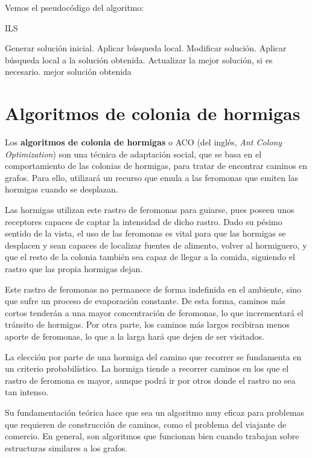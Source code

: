 Vemos el pseudocódigo del algoritmo:

\begin{algorithm}[H]
\caption{ILS}
  \begin{algorithmic}
    \State Generar solución inicial.
    \State Aplicar búsqueda local.
    \Repeat
      \State Modificar solución.
      \State Aplicar búsqueda local a la solución obtenida.
      \State Actualizar la mejor solución, si es necesario.
    \Return mejor solución obtenida
  \EndFunction
  \end{algorithmic}
\end{algorithm}

\section{Algoritmos de colonia de hormigas}\label{aco}

Los \textbf{algoritmos de colonia de hormigas} \citep{dorigo:1996} o ACO
(del inglés, \textit{Ant Colony Optimization}) son una técnica de adaptación social,
que se basa en el comportamiento de las colonias de hormigas, para tratar de encontrar
caminos en grafos. Para ello, utilizará un recurso que emula a las feromonas que
emiten las hormigas cuando se desplazan.

Las hormigas utilizan este rastro de feromonas para guiarse, pues poseen unos receptores
capaces de captar la intensidad de dicho rastro. Dado su pésimo sentido de la vista,
el uso de las feromonas es vital para que las hormigas se desplacen y sean capaces de
localizar fuentes de alimento, volver al hormiguero, y que el resto de la colonia también
sea capaz de llegar a la comida, siguiendo el rastro que las propia hormigas dejan.

Este rastro de feromonas no permanece de forma indefinida en el ambiente, sino que
sufre un proceso de evaporación constante. De esta forma, caminos más cortos tenderán
a una mayor concentración de feromonas, lo que incrementará el tránsito de hormigas.
Por otra parte, los caminos más largos recibiran menos aporte de feromonas, lo que a
la larga hará que dejen de ser visitados.

La elección por parte de una hormiga del camino que recorrer se fundamenta en un
criterio probabilístico. La hormiga tiende a recorrer caminos en los que el rastro
de feromona es mayor, aunque podrá ir por otros donde el rastro no sea tan intenso.

Su fundamentación teórica hace que sea un algoritmo muy eficaz para problemas que
requieren de construcción de caminos, como el problema del viajante de comercio.
En general, son algoritmos que funcionan bien cuando trabajan sobre estructuras
similares a los grafos.

